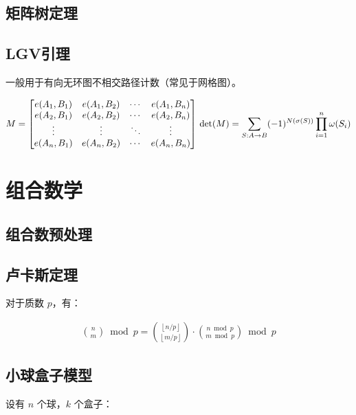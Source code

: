 \documentclass{article}
\begin{document}
\subsection{矩阵树定理}

\subsection{LGV引理}
一般用于有向无环图不相交路径计数（常见于网格图）。

$$
M = \begin{bmatrix}e(A_1,B_1)&e(A_1,B_2)&\cdots&e(A_1,B_n)\\ 
e(A_2,B_1)&e(A_2,B_2)&\cdots&e(A_2,B_n)\\ 
\vdots&\vdots&\ddots&\vdots\\ 
e(A_n,B_1)&e(A_n,B_2)&\cdots&e(A_n,B_n)\end{bmatrix}\\ 
\det(M)=\sum\limits_{S:A\rightarrow B}(-1)^{N(\sigma(S))}\prod\limits_{i=1}^n \omega(S_i)
$$

\section{组合数学}
\subsection{组合数预处理}

\subsection{卢卡斯定理}

对于质数 $p$，有：

$$
\begin{aligned}
\binom{n}{m}\bmod p = \binom{\left\lfloor n/p \right\rfloor}{\left\lfloor m/p\right\rfloor}\cdot\binom{n\bmod p}{m\bmod p}\bmod p
\end{aligned}
$$



\subsection{小球盒子模型}

设有 $n$ 个球，$k$ 个盒子：
\end{document}
